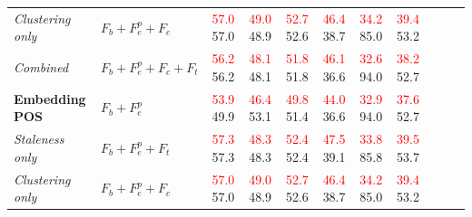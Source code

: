 \documentclass{article}
\newcommand{\sub}[1]{\textcolor{red}{#1}}
\begin{document}
\begin{table}[tb]
{\begin{center}
\begin{tabular}{llccccccccc}
\hspace{2mm} {\textit{Clustering only}} & $F_b+F_e^p+F_c$ & 
  \sub{57.0} \hspace{1mm} 57.0 & \sub{49.0} \hspace{1mm} 48.9 & \sub{52.7} \hspace{1mm} 52.6 &
  \sub{46.4} \hspace{1mm} 38.7 & \sub{34.2} \hspace{1mm} 85.0 & \sub{39.4} \hspace{1mm} 53.2 \\
\hspace{2mm} {\textit{Combined}} & $F_b+F_e^p+F_c+F_t$ &
  \sub{56.2} \hspace{1mm} 56.2 & \sub{48.1} \hspace{1mm} 48.1 & \sub{51.8} \hspace{1mm} 51.8 &
  \sub{46.1} \hspace{1mm} 36.6 & \sub{32.6} \hspace{1mm} 94.0 & \sub{38.2} \hspace{1mm} 52.7 \\
{\textbf{Embedding {POS}}} & $F_b+F_e^p$ & 
  \sub{53.9} \hspace{1mm} 49.9 & \sub{46.4} \hspace{1mm} 53.1 & \sub{49.8} \hspace{1mm} 51.4 &
  \sub{44.0} \hspace{1mm} 36.6 & \sub{32.9} \hspace{1mm} 94.0 & \sub{37.6} \hspace{1mm} 52.7 \\
\hspace{2mm} {\textit{Staleness only}} & $F_b+F_e^p+F_t$ & 
  \sub{57.3} \hspace{1mm} 57.3 & \sub{48.3} \hspace{1mm} 48.3 & \sub{52.4} \hspace{1mm} 52.4 &
  \sub{47.5} \hspace{1mm} 39.1 & \sub{33.8} \hspace{1mm} 85.8 & \sub{39.5} \hspace{1mm} 53.7 \\
\hspace{2mm} {\textit{Clustering only}} & $F_b+F_e^p+F_c$ & 
  \sub{57.0} \hspace{1mm} 57.0 & \sub{49.0} \hspace{1mm} 48.9 & \sub{52.7} \hspace{1mm} 52.6 &
  \sub{46.4} \hspace{1mm} 38.7 & \sub{34.2} \hspace{1mm} 85.0 & \sub{39.4} \hspace{1mm} 53.2 \\

\end{tabular}
\end{center}}
\end{table}
\end{document}
